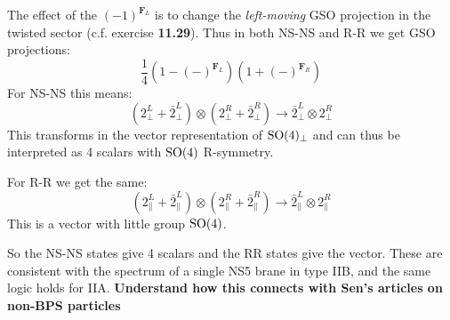 \documentclass[11pt, class=article, crop=false]{standalone}
\begin{document}
\begin{enumerate}
	The effect of the $(-1)^{\mathbf{F}_L}$ is to change the \emph{left-moving} GSO projection in the twisted sector (c.f. exercise \textbf{11.29}). Thus in both NS-NS and R-R we get GSO projections:
	\[
		\frac14 (1 - (-)^{\mathbf{F}_L}) (1 + (-)^{\mathbf{F}_R}) 
	\]
	For NS-NS this means:
	\[
		(2_\perp^L + \bar 2_\perp^L) \otimes (2_\perp^R + \bar 2_\perp^R) \to \bar 2_\perp^L \otimes  2_\perp^R
	\]
	This transforms in the vector representation of $\mathrm{SO}(4)_\perp$ and can thus be interpreted as 4 scalars with $\mathrm{SO}(4)$ R-symmetry.

	For R-R we get the same:
	\[
		(2_\parallel^L + \bar 2_\parallel^L) \otimes (2_\parallel^R + \bar 2_\parallel^R) \to \bar 2_\parallel^L \otimes  2_\parallel^R
	\]
	This is a vector with little group $\mathrm{SO}(4)$.
	
	So the NS-NS states give 4 scalars and the RR states give the vector. These are consistent with the spectrum of a single NS5 brane in type IIB, and the same logic holds for IIA. \textbf{Understand how this connects with Sen's articles on non-BPS particles} 
	
	
		
\end{enumerate}

\end{document}
